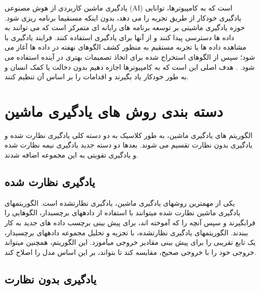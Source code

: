 


یادگیری ماشین کاربردی از هوش مصنوعی (AI) است که به کامپیوترها، توانایی یادگیری خودکار از طریق تجربه  را می دهد، بدون اینکه مسنقیما برنامه ریزی شود. حوزه یادگیری ماشینی بر توسعه برنامه های رایانه ای متمرکز است که می توانند به داده ها دسترسی پیدا کنند و از آنها برای یادگیری استفاده کنند. فرایند یادگیری با مشاهده داده ها یا تجربه مستقیم  به منظور کشف الگوهای نهفته در داده ها آغاز می شود؛  سپس از الگوهای  استخراج شده برای اتخاذ تصمیمات بهتری در آینده استفاده می شود. . هدف اصلی این است که به کامپیوترها اجازه دهیم بدون دخالت یا کمک انسان و به طور خودکار یاد بگیرند و اقدامات را بر اساس آن تنظیم کنند.

\section{دسته بندی روش های یادگیری ماشین}
الگوریتم های یادگیری ماشین، به طور کلاسیک به دو دسته کلی یادگیری نظارت شده و یادگیری بدون نظارت تقسیم می شوند. بعدها دو دسته جدید یادگیری نیمه نظارت شده و یادگیری تقویتی به این مجموعه اضافه شدند.
\subsection{یادگیری نظارت شده}

یکی از مهم\nf ترین روش\nf های یادگیری ماشین، یادگیری نظارت\nf شده است. الگوریتم\nf های یادگیری ماشین نظارت \nf شده می\nf توانند  با استفاده از داده\nf های برچسب\nf دار، الگوهایی  را فرابگیرند و سپس آنچه را که آموخته اند، برای پیش بینی برچسب داده های جدید به کار ببندند. الگوریتم\nf های یادگیری نظارت\nf شده، با تجزیه و تحلیل مجموعه داده\nf های برچسب\nf دار، یک تابع تقریبی را برای پیش بینی مقادیر خروجی می\nf آموزد. این الگوریتم، همچنین می\nf تواند خروجی خود را با خروجی صحیح، مقایسه کند تا بتواند، بر این اساس مدل را اصلاح کند.

\subsection{یادگیری بدون نظارت}

